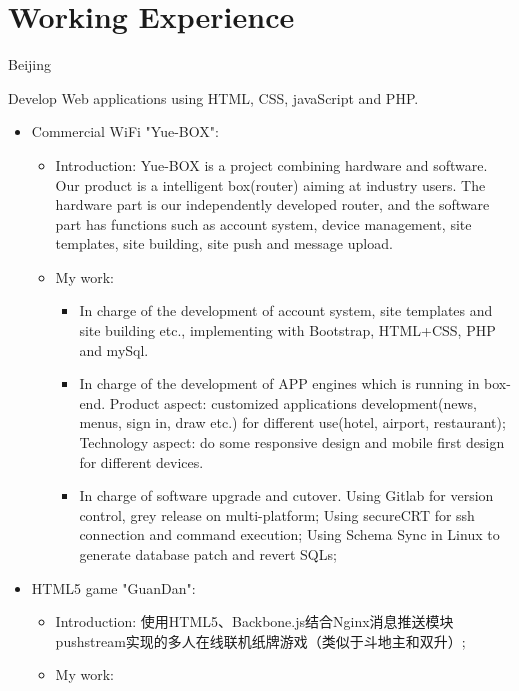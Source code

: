 \documentclass[11pt,a4paper,sans]{moderncv}        %
\begin{document}
\section{Working Experience}
 {Beijing}{}
{Develop Web applications using HTML, CSS, javaScript and PHP.
\newline{}%
\begin{itemize}%
\item Commercial WiFi "Yue-BOX":
  \begin{itemize}%
  \item Introduction: Yue-BOX is a project combining hardware and software. Our product is a intelligent box(router) aiming at industry users. The hardware part is our independently developed router, and the software part has functions such as account system, device management, site templates, site building, site push and message upload.
  \item My work:
      \begin{itemize}%
        \item In charge of the development of account system, site templates and site building etc., implementing with Bootstrap, HTML+CSS, PHP and mySql.
        \item In charge of the development of APP engines which is running in box-end. Product aspect: customized applications development(news, menus, sign in, draw etc.) for different use(hotel, airport, restaurant); Technology aspect: do some responsive design and mobile first design for different devices.
        \item In charge of software upgrade and cutover. Using Gitlab for version control, grey release on multi-platform; Using secureCRT for ssh connection and command execution; Using Schema Sync in Linux to generate database patch and revert SQLs;
      \end{itemize}
  \end{itemize}
\item HTML5 game "GuanDan":
  \begin{itemize}%
  \item Introduction: 使用HTML5、Backbone.js结合Nginx消息推送模块pushstream实现的多人在线联机纸牌游戏（类似于斗地主和双升）;
  \item My work:
      \begin{itemize}%

\end{itemize}
\end{itemize}
\end{itemize}}
\end{document}
